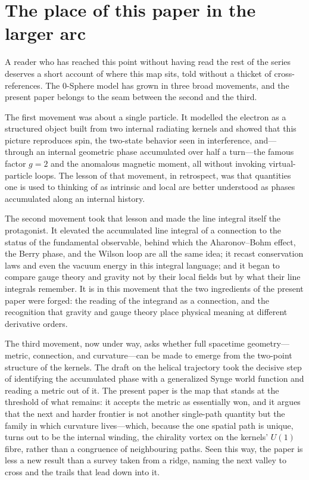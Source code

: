 \documentclass[%
 reprint, amsmath,amssymb, aps, prb, ]{revtex4-2}
\numberwithin{equation}{section}
\begin{document}
\section{The place of this paper in the larger arc}
\label{sec:place}

A reader who has reached this point without having read the rest of the series deserves a short account of where this map sits, told without a thicket of cross-references. The 0-Sphere model has grown in three broad movements, and the present paper belongs to the seam between the second and the third.

The first movement was about a single particle. It modelled the electron as a structured object built from two internal radiating kernels and showed that this picture reproduces spin, the two-state behavior seen in interference, and---through an internal geometric phase accumulated over half a turn---the famous factor $g=2$ and the anomalous magnetic moment, all without invoking virtual-particle loops. The lesson of that movement, in retrospect, was that quantities one is used to thinking of as intrinsic and local are better understood as phases accumulated along an internal history.

The second movement took that lesson and made the line integral itself the protagonist. It elevated the accumulated line integral of a connection to the status of the fundamental observable, behind which the Aharonov--Bohm effect, the Berry phase, and the Wilson loop are all the same idea; it recast conservation laws and even the vacuum energy in this integral language; and it began to compare gauge theory and gravity not by their local fields but by what their line integrals remember. It is in this movement that the two ingredients of the present paper were forged: the reading of the integrand as a connection, and the recognition that gravity and gauge theory place physical meaning at different derivative orders.

The third movement, now under way, asks whether full spacetime geometry---metric, connection, and curvature---can be made to emerge from the two-point structure of the kernels. The draft on the helical trajectory took the decisive step of identifying the accumulated phase with a generalized Synge world function and reading a metric out of it. The present paper is the map that stands at the threshold of what remains: it accepts the metric as essentially won, and it argues that the next and harder frontier is not another single-path quantity but the family in which curvature lives---which, because the one spatial path is unique, turns out to be the internal winding, the chirality vortex on the kernels' $U(1)$ fibre, rather than a congruence of neighbouring paths. Seen this way, the paper is less a new result than a survey taken from a ridge, naming the next valley to cross and the trails that lead down into it.
\end{document}
